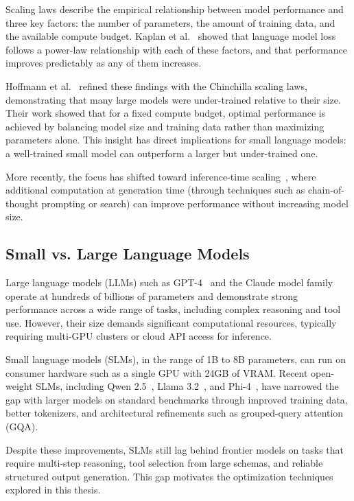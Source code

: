 Scaling laws describe the empirical relationship between model performance and three key factors: the number of parameters, the amount of training data, and the available compute budget. Kaplan et al.~\cite{kaplan2020scaling} showed that language model loss follows a power-law relationship with each of these factors, and that performance improves predictably as any of them increases.

Hoffmann et al.~\cite{hoffmann2022training} refined these findings with the Chinchilla scaling laws, demonstrating that many large models were under-trained relative to their size. Their work showed that for a fixed compute budget, optimal performance is achieved by balancing model size and training data rather than maximizing parameters alone. This insight has direct implications for small language models: a well-trained small model can outperform a larger but under-trained one.

More recently, the focus has shifted toward inference-time scaling~\cite{snell2024scaling}, where additional computation at generation time (through techniques such as chain-of-thought prompting or search) can improve performance without increasing model size.

\subsection{Small vs. Large Language Models}

Large language models (LLMs) such as GPT-4~\cite{openai2023gpt4} and the Claude model family operate at hundreds of billions of parameters and demonstrate strong performance across a wide range of tasks, including complex reasoning and tool use. However, their size demands significant computational resources, typically requiring multi-GPU clusters or cloud API access for inference.

Small language models (SLMs), in the range of 1B to 8B parameters, can run on consumer hardware such as a single GPU with 24GB of VRAM. Recent open-weight SLMs, including Qwen 2.5~\cite{qwen2024qwen25}, Llama 3.2~\cite{llama2024llama32}, and Phi-4~\cite{abdin2024phi}, have narrowed the gap with larger models on standard benchmarks through improved training data, better tokenizers, and architectural refinements such as grouped-query attention (GQA).

Despite these improvements, SLMs still lag behind frontier models on tasks that require multi-step reasoning, tool selection from large schemas, and reliable structured output generation. This gap motivates the optimization techniques explored in this thesis.

